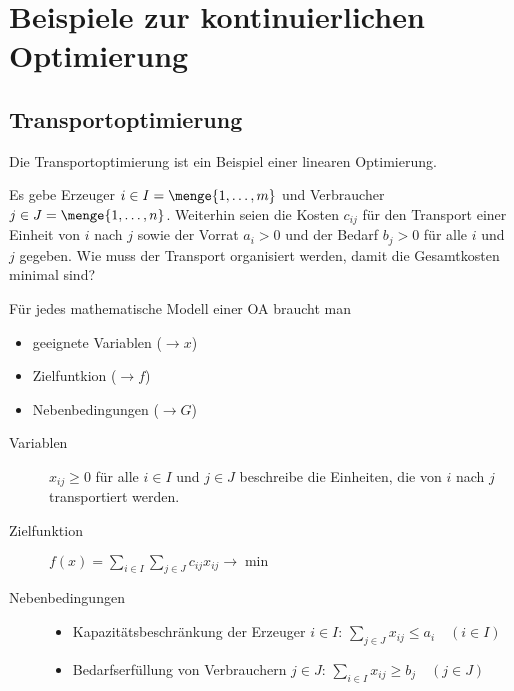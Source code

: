 \section{Beispiele zur kontinuierlichen Optimierung}

\subsection{Transportoptimierung}

Die Transportoptimierung ist ein Beispiel einer linearen Optimierung.

Es gebe Erzeuger $i \in I = \menge{1, \dots , m}$ und Verbraucher $j \in J = \menge{1, \dots , n}$. Weiterhin seien die Kosten $c_{ij}$ für den Transport einer Einheit von $i$ nach $j$ sowie der Vorrat $a_i > 0$ und der Bedarf $b_j > 0$ für alle $i$ und $j$ gegeben. Wie muss der Transport organisiert werden, damit die Gesamtkosten minimal sind?

Für jedes mathematische Modell einer OA braucht man
\begin{itemize}[nolistsep, topsep=-\parskip]
	\item geeignete Variablen ($\to x$)
	\item Zielfuntkion ($\to f$)
	\item Nebenbedingungen ($\to G$)
\end{itemize}

\begin{description}
	\item[Variablen] $x_{ij} \ge 0$ für alle $i \in I$ und $j \in J$ beschreibe die Einheiten, die von $i$ nach $j$ transportiert werden.
	\item[Zielfunktion] $f(x) = \sum\limits_{i \in I} \sum\limits_{j \in J} c_{ij} x_{ij} \to \min$
	\item[Nebenbedingungen] \leavevmode
	\begin{itemize}[nolistsep, topsep=-\parskip]
		\item Kapazitätsbeschränkung der Erzeuger $i \in I$: $\sum\limits_{j \in J} x_{ij} \le a_i \quad (i \in I)$
		\item Bedarfserfüllung von Verbrauchern $j \in J$: $\sum\limits_{i \in I} x_{ij} \ge b_j \quad (j \in J) $
	\end{itemize}
\end{description}

